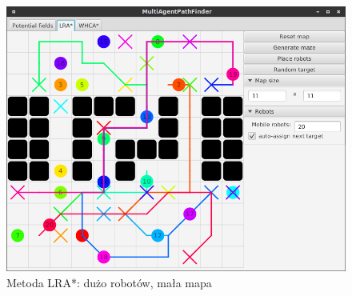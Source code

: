 
\begin{figure}
	\centering
	\includegraphics[width=0.8\columnwidth]{img/robopath/lra-lot-robots}
	\caption{Metoda LRA*: dużo robotów, mała mapa}
	\label{fig:test-lra-lot-robots}
\end{figure}